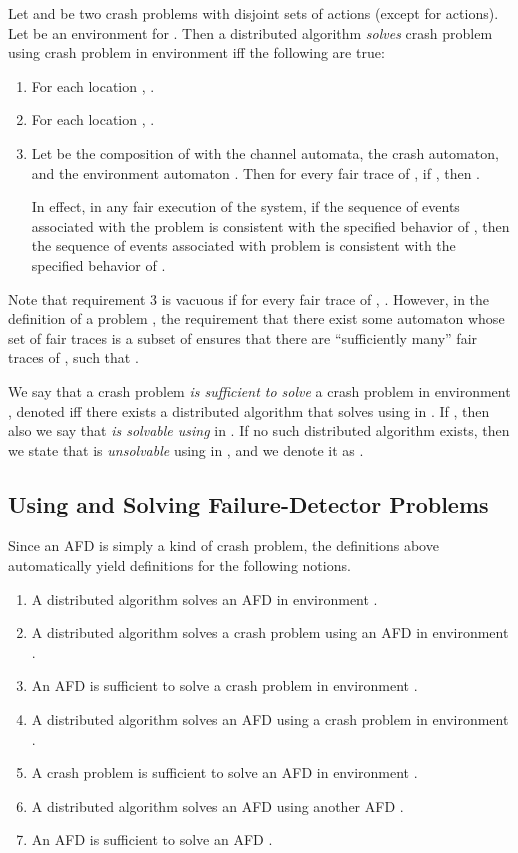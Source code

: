 \documentclass[11pt]{article}
\numberwithin{theorem}{section}
\begin{document}
Let  and  be two
crash problems with disjoint sets of actions (except for 
actions).
Let  be an environment for .
Then a distributed algorithm  \emph{solves} crash problem  using
crash problem  in environment  iff the following are
true:
\begin{enumerate}
\item
For each location , . 
\item
For each location , .
\item
Let  be the composition of  with the channel automata,
the crash automaton, and the environment automaton . 
Then for every fair trace  of , 
if , then . 

In effect, in any fair execution of the system, if the sequence
of events associated with the problem  is consistent with the
specified behavior of , then the sequence of events associated
with problem  is consistent with the specified behavior of .
\end{enumerate}

Note that requirement 3 is vacuous if for every fair trace  of
, . 
However, in the definition of a problem , the requirement
that there exist some automaton whose set of fair traces is a subset
of  ensures that there are ``sufficiently many'' fair traces 
of , such that .


We say that a crash problem  
\emph{is sufficient to solve} a crash problem 
in environment , denoted  iff
there exists a distributed algorithm  that solves  using  in
. If , then also we say that
 \emph{is solvable using}  in . If no such
distributed algorithm exists, then we state that  is
\emph{unsolvable} using  in , and we denote it as .

\subsection{Using and Solving Failure-Detector Problems}
\label{subsec:solvingFDproblemsWithAnother}

Since an AFD is simply a kind of crash problem, the definitions above
automatically yield definitions for the following notions.
\begin{enumerate}
\item 
A distributed algorithm  solves an AFD  in environment .
\item 
A distributed algorithm  solves a crash problem  using an AFD
 in environment .
\item 
An AFD  is sufficient to solve a crash problem  in environment
.
\item 
A distributed algorithm  solves an AFD  using a crash problem
 in environment .
\item 
A crash problem  is sufficient to solve an AFD  in environment
.
\item 
A distributed algorithm  solves an AFD  using another AFD
.
\item 
An AFD  is sufficient to solve an AFD .
\end{enumerate}
\end{document}
